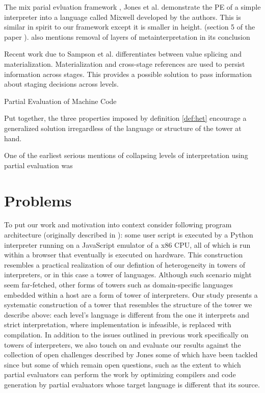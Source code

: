 \documentclass[fleqn]{article}
\theoremstyle{definition}
\begin{document}
The mix parial evluation framework \cite{jones1989mix}, Jones et al. demonstrate the PE of a simple interpreter into a language called Mixwell developed by the authors. This is similar in spirit to our framework except it is smaller in height. (section 5 of the paper \cite{jones1989mix}). also mentions removal of layers of metainterpretation in its conclusion

Recent work due to Sampson et al. \cite{sampson2017static} differentiates between value splicing and materialization. Materialization and cross-stage references are used to persist information across stages. This provides a possible solution to pass information about staging decisions across levels.

Partial Evaluation of Machine Code

Put together, the three properties imposed by definition \ref{def:het} encourage a generalized solution irregardless of the language or structure of the tower at hand.

One of the earliest serious mentions of collapsing levels of interpretation using partial evaluation was \cite{sturdy1993lisp}

\section{Problems}
To put our work and motivation into context consider following program architecture (originally described in \cite{amin2017collapsing}): some user script is executed by a Python interpreter running on a JavaScript emulator of a x86 CPU, all of which is run within a browser that eventually is executed on hardware. This construction resembles a practical realization of our defintion of heterogeneity in towers of interpreters, or in this case a tower of languages. Although such scenario might seem far-fetched, other forms of towers such as domain-specific languages embedded within a host are a form of tower of interpreters. Our study presents a systematic construction of a tower that resembles the structure of the tower we describe above: each level's language is different from the one it interprets and strict interpretation, where implementation is infeasible, is replaced with compilation. In addition to the issues outlined in previous work specifically on towers of interpreters, we also touch on and evaluate our results against the collection of open challenges described by Jones \cite{jones1988challenging} some of which have been tackled since but some of which remain open questions, such as the extent to which partial evaluators can perform the work by optimizing compilers and code generation by partial evaluators whose target language is different that its source. %
\end{document}
